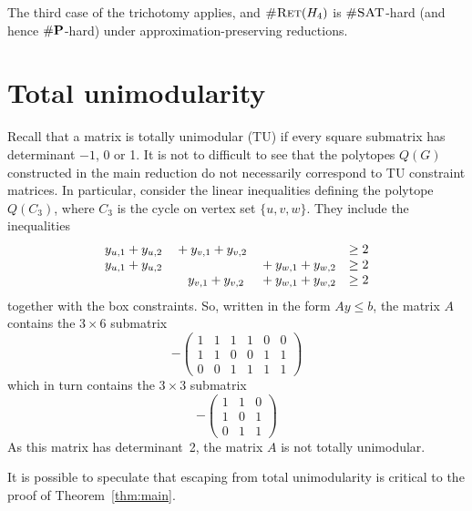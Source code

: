 \documentclass[11pt, oneside]{article}   	%
\def\numP{\textup{\#}\mathbf{P}}
\def\nSAT{\textsc{\#SAT}}
\def\nRet{\textsc{\#Ret}}
\def\Hfour{H_4}
\begin{document}
The third case of the trichotomy applies, and $\nRet(\Hfour)$ is $\nSAT$-hard (and hence $\numP$-hard) under approximation-preserving reductions.

\section{Total unimodularity}
Recall that a matrix is totally unimodular (TU) if every square submatrix has determinant $-1$, 0 or 1.   It is not to difficult to see that the polytopes $Q(G)$ constructed in the main reduction do not necessarily correspond to TU constraint matrices.  In particular, consider the linear inequalities defining the polytope $Q(C_3)$, where $C_3$ is the cycle on vertex set $\{u,v,w\}$.  They include the inequalities
$$\begin{matrix}
y_{u,1}+y_{u,2}&{}+y_{v,1}+y_{v,2}&&\geq2\\
y_{u,1}+y_{u,2}&&{}+y_{w,1}+y_{w,2}&\geq2\\
&\hphantom{{}+} y_{v,1}+y_{v,2}&{}+y_{w,1}+y_{w,2}&\geq2
\end{matrix}$$
together with the box constraints.  So, written in the form $Ay\leq b$, the matrix $A$ contains the $3\times6$ submatrix
$$
-\begin{pmatrix}
1&1&1&1&0&0\\
1&1&0&0&1&1\\
0&0&1&1&1&1
\end{pmatrix}
$$
which in turn contains the $3\times3$ submatrix 
$$-\begin{pmatrix}
1&1&0\\
1&0&1\\
0&1&1
\end{pmatrix}
$$
As this matrix has determinant~2, the matrix $A$ is not totally unimodular.

It is possible to speculate that escaping from total unimodularity is critical to the proof of Theorem~\ref{thm:main}.



\end{document}
